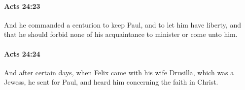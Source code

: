 		\paragraph{Acts 24:23} %
			\label{ACTS-24-23}

			And he commanded a centurion to keep Paul, and to let him have liberty, and that he should forbid none of his acquaintance to minister or come unto him.

			\begin{framed}
			\scriptsize
				\begin{compactdesc}
					\item[SBLG] 
				\end{compactdesc}
			\end{framed}

		\paragraph{Acts 24:24} %
			\label{ACTS-24-24}

			And after certain days, when Felix came with his wife Drusilla, which was a Jewess, he sent for Paul, and heard him concerning the faith in Christ.

